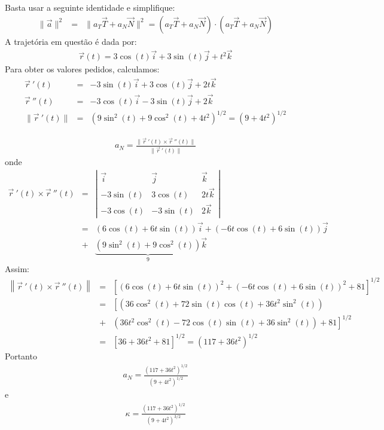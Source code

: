 \begin{resol}
Basta usar a seguinte identidade e simplifique:
\begin{eqnarray*}
 \|\vec{a}\|^2&=&\|a_T\vec{T}+a_N\vec{N}\|^2= \left(a_T\vec{T}+a_N\vec{N}\right)\cdot \left(a_T\vec{T}+a_N\vec{N}\right)
 \end{eqnarray*}
A trajetória em questão é dada por:
\begin{eqnarray*}\vec{r}(t)=3\cos (t) \vec{i} + 3\sin (t) \vec{j} +t^2\vec{k}
\end{eqnarray*}
Para obter os valores pedidos, calculamos:
\begin{eqnarray*}\vec{r}~\!'(t)&=&-3\sin (t) \vec{i} + 3\cos (t) \vec{j} +2t\vec{k}\\
\vec{r}~\!''(t)&=&-3\cos (t) \vec{i} - 3\sin (t) \vec{j} +2\vec{k}\\
\|\vec{r}~\!'(t)\|&=&\left(9\sin^2(t)+9\cos^2(t)+4t^2\right)^{1/2}=\left(9+4t^2\right)^{1/2}
\end{eqnarray*}

\begin{eqnarray*}a_N=\frac{\|\vec{r}~\!'(t)\times \vec{r}~\!''(t)\|}{\|\vec{r}~\!'(t)\|}
\end{eqnarray*}
onde
\begin{eqnarray*}\vec{r}~\!'(t)\times \vec{r}~\!''(t)&=&
\left|\begin{array}{ccc}
\vec{i}&\vec{j}&\vec{k}\\
-3\sin (t) & 3\cos (t) & 2t\vec{k}\\
-3\cos (t) & -3\sin (t) & 2\vec{k}
\end{array}
\right|\\&=&\left(6\cos(t)+6t\sin(t)\right)\vec{i}+\left(-6t\cos(t) +6\sin(t)\right)\vec{j}\\&+&\underbrace{\left(9\sin^2(t)+9\cos^2(t)\right)}_{9}\vec{k}
\end{eqnarray*}
Assim:
\begin{eqnarray*}
\left\|\vec{r}~\!'(t)\times \vec{r}~\!''(t)\right\|&=&\left[\left(6\cos(t)+6t\sin(t)\right)^2+\left(-6t\cos(t) +6\sin(t)\right)^2+81\right]^{1/2}\\
&=&\left[\left(36\cos^2(t)+72\sin(t)\cos(t) + 36t^2\sin^2(t)\right)\right.\\&+&\left.\left(36t^2\cos^2(t) -72 \cos(t)\sin(t) + 36 \sin^2(t)\right) + 81\right]^{1/2}\\
&=&\left[36+36t^2+81\right]^{1/2}=\left(117+36t^2\right)^{1/2}
\end{eqnarray*}
Portanto
\begin{eqnarray*}a_N=\frac{\left(117+36t^2\right)^{1/2}}{\left(9+4t^2\right)^{1/2}}
\end{eqnarray*}
e
\begin{eqnarray*}\kappa=\frac{\left(117+36t^2\right)^{1/2}}{\left(9+4t^2\right)^{3/2}}
\end{eqnarray*}


\end{resol}
